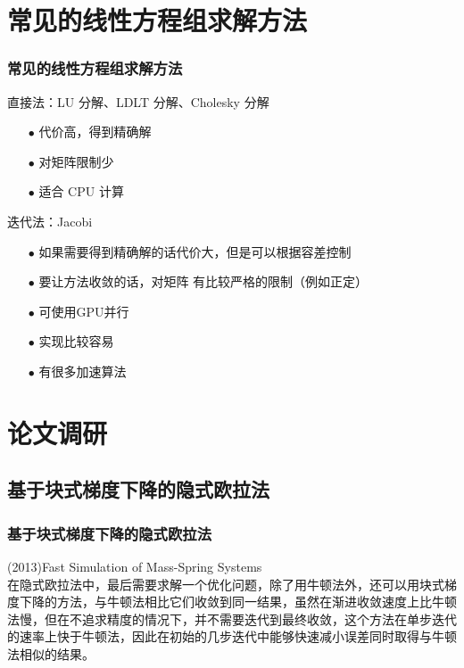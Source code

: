 \documentclass[aspectratio=43]{ctexbeamer}
\begin{document}
\section{常见的线性方程组求解方法}
\begin{frame}
  \frametitle{常见的线性方程组求解方法}
		直接法：LU 分解、LDLT 分解、Cholesky 分解
		\begin{itemize}
			\item[$\bullet$] 代价高，得到精确解
			\item[$\bullet$] 对矩阵限制少
			\item[$\bullet$] 适合 CPU 计算
		\end{itemize}

		迭代法：Jacobi
		\begin{itemize}
			\item[$\bullet$] 如果需要得到精确解的话代价大，但是可以根据容差控制
			\item[$\bullet$] 要让方法收敛的话，对矩阵 有比较严格的限制（例如正定）
			\item[$\bullet$] 可使用GPU并行
			\item[$\bullet$] 实现比较容易
			\item[$\bullet$] 有很多加速算法
		\end{itemize}
\end{frame}

\section{论文调研}
\subsection{基于块式梯度下降的隐式欧拉法}
\begin{frame}
  \frametitle{基于块式梯度下降的隐式欧拉法}
	(2013)Fast Simulation of Mass-Spring Systems\\[10pt]

		\; \;在隐式欧拉法中，最后需要求解一个优化问题，除了用牛顿法外，还可以用块式梯度下降的方法，与牛顿法相比它们收敛到同一结果，虽然在渐进收敛速度上比牛顿法慢，但在不追求精度的情况下，并不需要迭代到最终收敛，这个方法在单步迭代的速率上快于牛顿法，因此在初始的几步迭代中能够快速减小误差同时取得与牛顿法相似的结果。
\end{frame}
\end{document}
